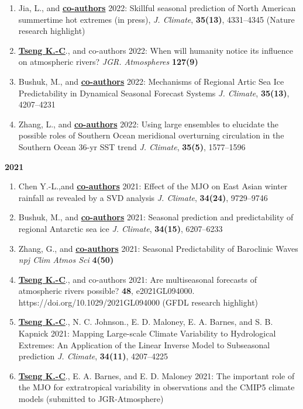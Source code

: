 \documentclass{article}
\begin{document}
\begin{enumerate}[resume]     
	\item Jia, L., and \normalsize{\bf{\underline{co-authors}}} 2022: Skillful seasonal prediction of North American summertime hot extremes (in press), \textit{J. Climate}, \normalsize{\bf{35(13)}}, 4331--4345 (Nature research highlight)
	\item \normalsize{\bf{\underline{Tseng K.-C}}}., and co-authors 2022: When will humanity notice its influence on atmospheric rivers? \textit{JGR. Atmospheres} \normalsize{\bf{127(9)}} 
	\item Bushuk, M., and \normalsize{\bf{\underline{co-authors}}} 2022: Mechanisms of Regional Artic Sea Ice Predictability in Dynamical Seasonal Forecast Systems \textit{J. Climate}, \normalsize{\bf{35(13)}}, 4207--4231
	\item Zhang, L., and \normalsize{\bf{\underline{co-authors}}} 2022: Using large ensembles to elucidate the possible roles of Southern Ocean meridional overturning circulation in the Southern Ocean 36-yr SST trend \textit{J. Climate}, \normalsize{\bf{35(5)}}, 1577--1596
\end{enumerate}
\normalsize{\bf{2021}} 
\begin{enumerate}[resume]   
	\item Chen Y.-L.,and \normalsize{\bf{\underline{co-authors}}} 2021: Effect of the MJO on East Asian winter rainfall as revealed by a SVD analysis \textit{J. Climate}, \normalsize{\bf{34(24)}}, 9729--9746 \par
	\item Bushuk, M., and \normalsize{\bf{\underline{co-authors}}} 2021: Seasonal prediction and predictability of regional Antarctic sea ice \textit{J. Climate}, \normalsize{\bf{34(15)}}, 6207--6233 \par
	\item Zhang, G., and \normalsize{\bf{\underline{co-authors}}} 2021: Seasonal Predictability of Baroclinic Waves \textit{npj Clim Atmos Sci} \normalsize{\bf{4(50)}}  \par
    \item \normalsize{\bf{\underline{Tseng K.-C}}}., and co-authors 2021: Are multiseasonal forecasts of atmospheric rivers possible? \normalsize{\bf{48}}, e2021GL094000. https://doi.org/10.1029/2021GL094000 (GFDL research highlight)\par
	\item \normalsize{\bf{\underline{Tseng K.-C}}}., N. C. Johnson., E. D. Maloney, E. A. Barnes, and S. B. Kapnick 2021: Mapping Large-scale Climate Variability to Hydrological Extremes: An Application of the Linear Inverse Model to Subseasonal prediction \textit{J. Climate}, \normalsize{\bf{34(11)}}, 4207--4225 \par
	\item \normalsize{\bf{\underline{Tseng K.-C}}}., E. A. Barnes, and E. D. Maloney 2021: The important role of the MJO for extratropical variability in observations and the CMIP5 climate models (submitted to JGR-Atmosphere)  \par 
	 \end{enumerate}
\end{document}
